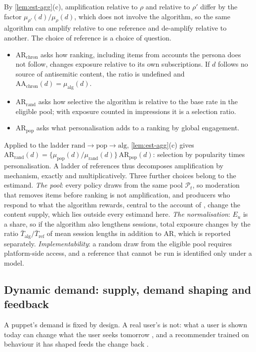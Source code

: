 By \cref{lem:est-agg}(c), amplification relative to $\rho$ and relative to $\rho'$ differ by the factor $\mu_{\rho'}(d)/\mu_\rho(d)$, which does not involve the algorithm, so the same algorithm can amplify relative to one reference and de-amplify relative to another. The choice of reference is a choice of question.
\begin{itemize}
  \item $\mathrm{AR}_{\mathrm{chron}}$ asks how ranking, including items from accounts the persona does not follow, changes exposure relative to its own subscriptions. If $d$ follows no source of antisemitic content, the ratio is undefined and $\mathrm{AA}_{\mathrm{chron}}(d)=\mu_{\mathrm{alg}}(d)$.
  \item $\mathrm{AR}_{\mathrm{rand}}$ asks how selective the algorithm is relative to the base rate in the eligible pool; with exposure counted in impressions it is a selection ratio.
  \item $\mathrm{AR}_{\mathrm{pop}}$ asks what personalisation adds to a ranking by global engagement.
\end{itemize}
Applied to the ladder $\mathrm{rand}\to\mathrm{pop}\to\mathrm{alg}$, \cref{lem:est-agg}(c) gives $\mathrm{AR}_{\mathrm{rand}}(d)=\{\mu_{\mathrm{pop}}(d)/\mu_{\mathrm{rand}}(d)\}\,\mathrm{AR}_{\mathrm{pop}}(d)$: selection by popularity times personalisation. A ladder of references thus decomposes amplification by mechanism, exactly and multiplicatively. Three further choices belong to the estimand. \emph{The pool}: every policy draws from the same pool $\mathcal P_t$, so moderation that removes items before ranking is not amplification, and producers who respond to what the algorithm rewards, central to the account of \citet{munger2022}, change the content supply, which lies outside every estimand here. \emph{The normalisation}: $E_u$ is a share, so if the algorithm also lengthens sessions, total exposure changes by the ratio $\bar T_{\mathrm{alg}}/\bar T_{\mathrm{ref}}$ of mean session lengths in addition to $\mathrm{AR}$, which is reported separately. \emph{Implementability}: a random draw from the eligible pool requires platform-side access, and a reference that cannot be run is identified only under a model.

\subsection{Dynamic demand: supply, demand shaping and feedback}\label{sec:est-decomp}

A puppet's demand is fixed by design. A real user's is not: what a user is shown today can change what the user seeks tomorrow \citep{jiang2019,carroll2022}, and a recommender trained on behaviour it has shaped feeds the change back \citep{chaney2018}.

